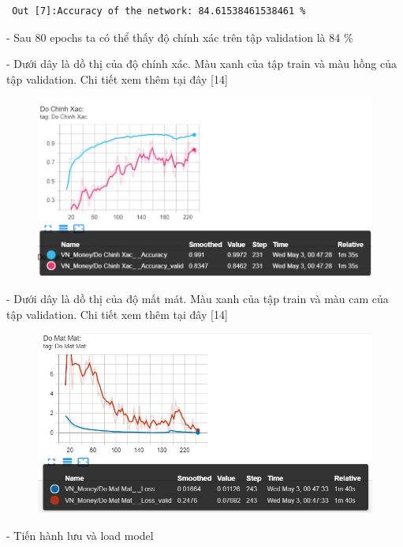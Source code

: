 \documentclass[12pt, a4paper]{article}
\begin{document}
\begin{verbatim}
 Out [7]:Accuracy of the network: 84.61538461538461 %   
\end{verbatim}
\par- Sau 80 epochs ta có thể thấy độ chính xác trên tập validation là 84 $\%$
\par- Dưới dây là dồ thị của độ chính xác. Màu xanh của tập train và màu hồng của tập validation.
Chi tiết xem thêm tại đây [14]

\begin{figure}[h] %
    \centering
    \includegraphics[scale = 0.6]{Img/Money/P2.png}
\end{figure}

\par - Dưới dây là dồ thị của độ mất mát. Màu xanh của tập train và màu cam của tập validation. Chi tiết xem thêm tại đây [14]
\begin{figure}[h] %
    \centering
    \includegraphics[scale = 0.65]{Img/Money/P3.png}
\end{figure}
\par - Tiến hành lưu và load model 
\end{document}
